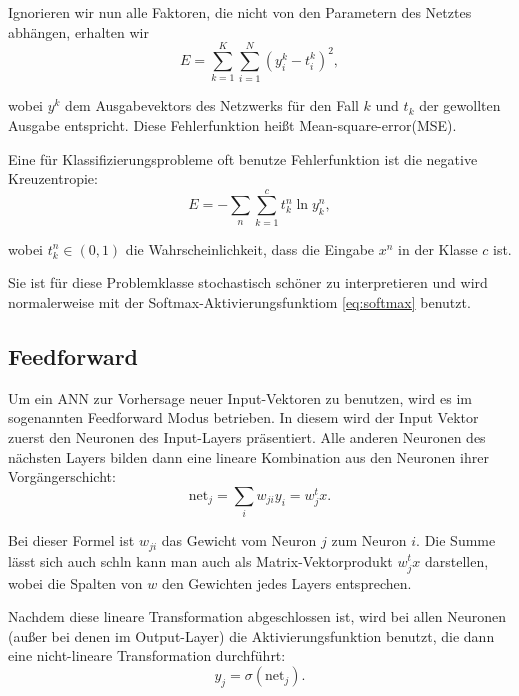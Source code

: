 Ignorieren wir nun alle Faktoren, die nicht von den Parametern des Netztes abhängen, erhalten wir 
\begin{equation}
\label{eq:MSE}
E = \sum_{k=1}^K \sum_{i=1}^N \left( y_i^k - t_i^k \right)^2,
\end{equation}

wobei $y^k$ dem Ausgabevektors des Netzwerks für den Fall $k$ und $t_k$ der gewollten Ausgabe entspricht.
Diese Fehlerfunktion heißt Mean-square-error(MSE)\cite{bishop1995neural}.

Eine für Klassifizierungsprobleme oft benutze Fehlerfunktion ist die negative Kreuzentropie:
\begin{equation}
\label{eq:crossEntropy}
    E = -\sum_{n} \sum_{k=1}^c t_k^n \ln y_k^n ,
\end{equation}

wobei $t_k^n \in (0,1)$ die Wahrscheinlichkeit, dass die Eingabe $x^n$ in der Klasse $c$ ist. 

Sie ist für diese Problemklasse stochastisch schöner zu interpretieren und wird normalerweise mit der Softmax-Aktivierungsfunktiom \ref{eq:softmax} benutzt\cite{bishop1995neural}.

\subsection{Feedforward}
Um ein ANN zur Vorhersage neuer Input-Vektoren zu benutzen, wird es im sogenannten Feedforward Modus betrieben. In diesem wird der Input Vektor zuerst den Neuronen des Input-Layers präsentiert. Alle anderen Neuronen des nächsten Layers bilden dann eine lineare Kombination aus den Neuronen ihrer Vorgängerschicht: 
\begin{equation}
\label{eq:feedforward1}
\text{net}_j = \sum_{i} w_{ji} y_i = w_j^t x.
\end{equation}

Bei dieser Formel ist $w_{ji}$ das Gewicht vom Neuron $j$ zum Neuron $i$. Die Summe lässt sich auch schln kann man auch als Matrix-Vektorprodukt $w_j^t x$ darstellen, wobei die Spalten von $w$ den Gewichten jedes Layers entsprechen. %

Nachdem diese lineare Transformation abgeschlossen ist, wird bei allen Neuronen (außer bei denen im Output-Layer) die Aktivierungsfunktion benutzt, die dann eine nicht-lineare Transformation durchführt: 
\begin{equation}
\label{eq:feedforward2}
y_j = \sigma (\text{net}_j).
\end{equation}

